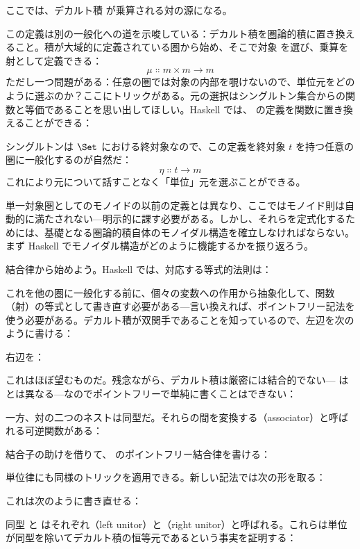 ここでは、デカルト積  が乗算される対の源になる。

この定義は別の一般化への道を示唆している：デカルト積を圏論的積に置き換えること。積が大域的に定義されている圏から始め、そこで対象  を選び、乗算を射として定義できる：
\[\mu \Colon m\times{}m \to m\]
ただし一つ問題がある：任意の圏では対象の内部を覗けないので、単位元をどのように選ぶのか？ここにトリックがある。元の選択はシングルトン集合からの関数と等価であることを思い出してほしい。Haskell では、 の定義を関数に置き換えることができる：

シングルトンは $\Set$ における終対象なので、この定義を終対象 $t$ を持つ任意の圏に一般化するのが自然だ：
\[\eta \Colon t \to m\]
これにより元について話すことなく「単位」元を選ぶことができる。

単一対象圏としてのモノイドの以前の定義とは異なり、ここではモノイド則は自動的に満たされない---明示的に課す必要がある。しかし、それらを定式化するためには、基礎となる圏論的積自体のモノイダル構造を確立しなければならない。まず Haskell でモノイダル構造がどのように機能するかを振り返ろう。

結合律から始めよう。Haskell では、対応する等式的法則は：

これを他の圏に一般化する前に、個々の変数への作用から抽象化して、関数（射）の等式として書き直す必要がある---言い換えれば、ポイントフリー記法を使う必要がある。デカルト積が双関手であることを知っているので、左辺を次のように書ける：

右辺を：

これはほぼ望むものだ。残念ながら、デカルト積は厳密には結合的でない--- は  とは異なる---なのでポイントフリーで単純に書くことはできない：

一方、対の二つのネストは同型だ。それらの間を変換する（associator）と呼ばれる可逆関数がある：

結合子の助けを借りて、 のポイントフリー結合律を書ける：

単位律にも同様のトリックを適用できる。新しい記法では次の形を取る：

これは次のように書き直せる：

同型  と  はそれぞれ（left unitor）と（right unitor）と呼ばれる。これらは単位 \code{()} が同型を除いてデカルト積の恒等元であるという事実を証明する：

